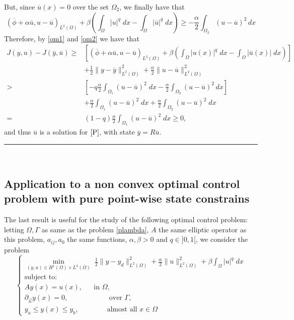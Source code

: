 \documentclass[11pt,a4paper]{amsart}
\newcommand{\kw}{\rule{2mm}{2mm}}
\newcommand{\om}{\Omega}
\renewenvironment{proof}{{Proof.}}{\hfill\kw}
\newcommand{\norm}[1]{\lVert #1 \rVert}
\begin{document}
\begin{proof}
    But, since $\overline{u}(x)=0$ over the set $\om_2$, we finally have that 
    \begin{equation}\label{om2}
        (\overline{\phi}+\alpha \overline{u},u-\overline{u})_{L^2(\Omega)}+\beta\left(\int_{\Omega}|u|^q\; dx-\int_{\om}|\overline{u}|^q\; dx\right)\ge -\frac{\alpha}{2}\int_{\om_2}(u-\overline{u})^2 \, dx
    \end{equation}
    Therefore, by \eqref{om1} and \eqref{om2} we have that
    \begin{align*}
        J(y,u)-J(\overline{y},\overline{u})\ge&\left[(\overline{\phi}+\alpha\overline{u},u-\overline{u})_{L^2(\Omega)}+\beta\left(\int_{\Omega}|u(x)|^q\; dx-\int_{\om}|\overline{u}(x)|\; dx\right)\right]\\
        &+\frac{1}{2}\norm{y-\overline{y}}_{L^2(\om)}^2+\frac{\alpha}{2}\norm{u-\overline{u}}_{L^2(\om)}^2\\
        >&\left[-q\frac{\alpha}{2}\int_{\om_1}(u-\overline{u})^2\; dx-\frac{\alpha}{2}\int_{\om_2}(u-\overline{u})^2 \, dx\right]\\
        &+\frac{\alpha}{2}\int_{\om_1}(u-\overline{u})^2\; dx+\frac{\alpha}{2}\int_{\om_2}(u-\overline{u})^2\; dx\\
        =&(1-q)\frac{\alpha}{2}\int_{\om_1}(u-\overline{u})^2\; dx\ge 0,
    \end{align*}
    and thus $\overline{u}$ is a solution for $\eqref{P}$, with state $\overline{y}=R\overline{u}$.
\end{proof}\\

\subsection{Application to a non convex optimal control problem with pure point-wise state constrains}

The last result is useful for the study of the following optimal control problem: letting $\Omega, \Gamma$ as same as the problem \eqref{plambda}, $A$ the same elliptic operator as this problem, $a_{ij}, a_0$ the same functions, $\alpha, \beta>0$ and $q\in ]0,1[$, we consider the problem
\begin{equation}\label{P}\tag{P}
    \begin{cases}
    \displaystyle\min_{(y,u)\in H^1(\om)\times L^2(\om)}\; \frac{1}{2}\norm{y-y_d}^2_{L^2(\om)}+\frac{\alpha}{2}\norm{u}^2_{L^2(\om)}+\beta \int_{\om} |u|^{q}\; dx\\
    \mbox{subject to:}\\
    Ay(x)=u(x), \phantom{aaa} \mbox{in } \om,\\
    \partial_{\Vec{n}}y(x)=0, \phantom{aaaaaaaaaaa} \mbox{over } \Gamma,\\    
    y_a\le y(x)\le y_b,\phantom{aaaaaaal} \mbox{almost all }x\in \Omega
    \end{cases}
\end{equation}
\end{document}
